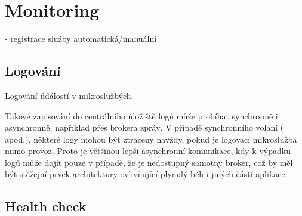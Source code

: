 \section{Monitoring}\label{sec:msa-monitoring}

- registrace služby automatická/manuální


\subsection{Logování}\label{subsec:msa-monitoring-logging}

Logování údálostí v mikroslužbých.

Takové zapisování do centrálního úložiště logů může probíhat synchronně i asynchronně, například přes brokera zpráv.
V případě synchronního volání (  apod.), některé logy mohou být ztraceny navždy, pokud je logovací mikroslužba mimo provoz.
Proto je většinou lepší asynchronní komunikace, kdy k výpadku logů může dojít pouze v případě, že je nedostupný samotný broker, což by měl být stěžejní prvek architektury ovlivňující plynulý běh i jiných částí aplikace.

\subsection{Health check}\label{subsec:msa-monitoring-healthcheck}
